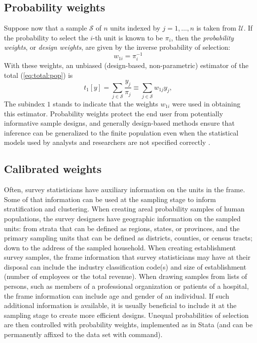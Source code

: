 \subsection{Probability weights}

Suppose now that a sample $\mathcal S$ of $n$ units indexed by $j=1,\ldots,n$
is taken from $\mathcal U$. If the probability to select the
$i$-th unit is known to be $\pi_i$, then 
the {\it probability weights}, or {\it design weights}, are given by
the inverse probability of selection:
\begin{equation}
   w_{1i} = \pi_i^{-1}
   \label{eq:prob:weight}
\end{equation}
With these weights, an unbiased
(design-based, non-parametric) estimator
of the total (\ref{eq:total:pop}) is \citep{horvitz:thompson:1952}
\begin{equation}
   t_{1}[y] = \sum_{j \in \mathcal{S}} \frac{y_j}{\pi_j}
   \equiv \sum_{j \in \mathcal{S}} w_{1j} y_j
   \label{eq:total:sample},
\end{equation}
The subindex $1$ stands to indicate that the weights $w_{1i}$ were
used in obtaining this estimator. Probability weights protect
the end user from potentially informative sample designs, and generally
design-based methods ensure that inference can be generalized
to the finite population even when the statistical models used
by analysts and researchers are not specified correctly
\citep{pfeff:1993,binder:roberts:2003}.

\subsection{Calibrated weights}
\label{subsec:calibration}

Often, survey statisticians have auxiliary information on the units
in the frame. Some of that information can be used at the sampling
stage to inform stratification and clustering. When creating areal
probability samples of human populations, the survey designers have
geographic information on the sampled units: from strata
that can be defined as regions, states, or provinces, and the primary
sampling units that can be defined as districts, counties, or census tracts;
down to the address of the sampled household. When creating establishment
survey samples, the frame information that survey statisticians may have
at their disposal can include the industry classification code(s) and size
of establishment (number of employees or the total revenue).
When drawing samples from lists of persons, such as members of a
professional organization or patients of a hospital, the frame information
can include age and gender of an individual. If such additional information
is available, it is usually beneficial to include it at the sampling stage
to create more efficient designs. Unequal probabilities of selection
are then controlled with probability weights, implemented
as \stcmd{[pw=}{\it exp}\stcmd{]} in Stata (and can be permanently
affixed to the data set with  command).


